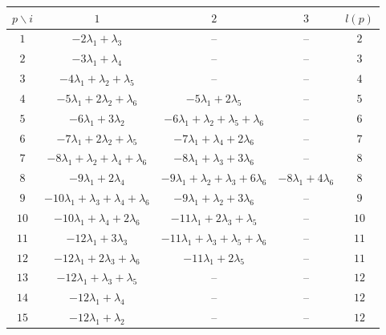 \begin{center}
\begin{tabular}{c c c c | c}
\hline
$p\backslash i$
& $1$ & $2$ & $3$ & $l(p)$\\
\hline
$1$
& $-2\lambda_1+\lambda_3$
& -- & -- & $2$\\

$2$
& $-3\lambda_1+\lambda_4$
& -- & -- & $3$\\

$3$
& $-4\lambda_1+\lambda_2+\lambda_5$
& -- & -- & $4$\\

$4$
& $-5\lambda_1+2\lambda_2+\lambda_6$
& $-5\lambda_1+2\lambda_5$
& -- & $5$\\

$5$
& $-6\lambda_1+3\lambda_2$
& $-6\lambda_1+\lambda_2+
\lambda_5+\lambda_6$
& -- & $6$\\

$6$
& $-7\lambda_1+2\lambda_2+\lambda_5$
& $-7\lambda_1+\lambda_4+2\lambda_6$
& -- & $7$\\

$7$
& $-8\lambda_1+\lambda_2+
\lambda_4+\lambda_6$
& $-8\lambda_1+\lambda_3+3\lambda_6$
& -- & $8$\\

$8$
& $-9\lambda_1+2\lambda_4$
& $-9\lambda_1+\lambda_2+
\lambda_3+6\lambda_6$
& $-8\lambda_1+4\lambda_6$
& $8$\\

$9$
& $-10\lambda_1+\lambda_3+
\lambda_4+\lambda_6$
& $-9\lambda_1+\lambda_2+3\lambda_6$
& -- & $9$\\

$10$
& $-10\lambda_1+\lambda_4+2\lambda_6$
& $-11\lambda_1+2\lambda_3+\lambda_5$
& -- & $10$\\

$11$
& $-12\lambda_1+3\lambda_3$
& $-11\lambda_1+\lambda_3+
\lambda_5+\lambda_6$
& -- & $11$\\

$12$
& $-12\lambda_1+2\lambda_3+\lambda_6$
& $-11\lambda_1+2\lambda_5$
& -- & $11$\\

$13$
& $-12\lambda_1+\lambda_3+\lambda_5$
& -- & -- & $12$\\

$14$
& $-12\lambda_1+\lambda_4$
& -- & -- & $12$\\

$15$
& $-12\lambda_1+\lambda_2$
& -- & -- & $12$\\
\hline
\end{tabular}%
\end{center}

